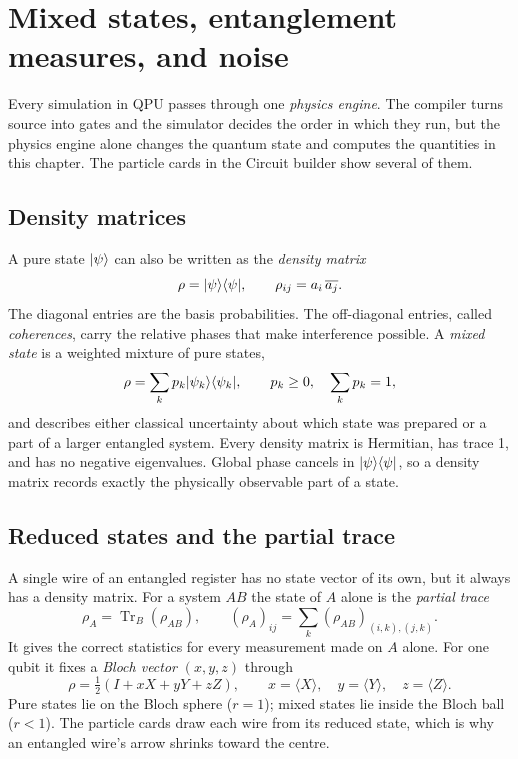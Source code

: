 \section{Mixed states, entanglement measures, and noise}
\hypertarget{mixed-states}{}

Every simulation in QPU passes through one \emph{physics engine}. The compiler
turns source into gates and the simulator decides the order in which they run,
but the physics engine alone changes the quantum state and computes the
quantities in this chapter. The particle cards in the Circuit builder show
several of them.

\subsection{Density matrices}

A pure state $\lvert \psi\rangle$ can also be written as the \emph{density matrix}
\[
\rho=\lvert \psi\rangle\langle \psi\rvert,\qquad \rho_{ij}=a_i\,\overline{a_j}.
\]
The diagonal entries are the basis probabilities. The off-diagonal entries,
called \emph{coherences}, carry the relative phases that make interference
possible. A \emph{mixed state} is a weighted mixture of pure states,
\[
\rho=\sum_k p_k\lvert \psi_k\rangle\langle \psi_k\rvert,\qquad p_k\ge0,\quad \sum_k p_k=1,
\]
and describes either classical uncertainty about which state was prepared or a
part of a larger entangled system. Every density matrix is Hermitian, has
trace 1, and has no negative eigenvalues. Global phase cancels in
$\lvert \psi\rangle\langle \psi\rvert$, so a density matrix records exactly the physically
observable part of a state.

\subsection{Reduced states and the partial trace}

A single wire of an entangled register has no state vector of its own, but it
always has a density matrix. For a system $AB$ the state of $A$ alone is the
\emph{partial trace}
\[
\rho_A=\operatorname{Tr}_B(\rho_{AB}),\qquad
(\rho_A)_{ij}=\sum_{k}(\rho_{AB})_{(i,k),(j,k)}.
\]
It gives the correct statistics for every measurement made on $A$ alone. For
one qubit it fixes a \emph{Bloch vector} $(x,y,z)$ through
\[
\rho=\tfrac12\left(I+xX+yY+zZ\right),\qquad
x=\langle X\rangle,\quad y=\langle Y\rangle,\quad z=\langle Z\rangle.
\]
Pure states lie on the Bloch sphere ($r=1$); mixed states lie inside the
Bloch ball ($r<1$). The particle cards draw each wire from its reduced state,
which is why an entangled wire's arrow shrinks toward the centre.

